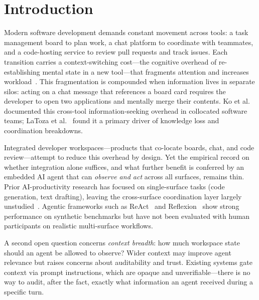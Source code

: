 \section{Introduction}
\label{sec:intro}

Modern software development demands constant movement across tools: a task
management board to plan work, a chat platform to coordinate with teammates,
and a code-hosting service to review pull requests and track issues. Each
transition carries a context-switching cost---the cognitive overhead of
re-establishing mental state in a new tool---that fragments attention and
increases workload~\cite{mark2008cost,czerwinski2004diary}. This fragmentation
is compounded when information lives in separate silos: acting on a chat
message that references a board card requires the developer to open two
applications and mentally merge their contents. Ko et
al.~\cite{ko2007information} documented this cross-tool information-seeking
overhead in collocated software teams; LaToza et al.~\cite{latoza2006maintaining}
found it a primary driver of knowledge loss and coordination breakdowns.

Integrated developer workspaces---products that co-locate boards, chat, and
code review---attempt to reduce this overhead by design. Yet the empirical record
on whether integration alone suffices, and what further benefit is conferred by
an embedded AI agent that can \emph{observe and act} across all surfaces, remains
thin. Prior AI-productivity research has focused on single-surface tasks
(code generation, text drafting), leaving the cross-surface coordination layer
largely unstudied~\cite{chen2021codex,noy2023}. Agentic frameworks such as
ReAct~\cite{yao2023react} and Reflexion~\cite{shinn2023reflexion} show strong
performance on synthetic benchmarks but have not been evaluated with human
participants on realistic multi-surface workflows.

A second open question concerns \emph{context breadth}: how much workspace state
should an agent be allowed to observe? Wider context may improve agent relevance
but raises concerns about auditability and trust. Existing systems gate context
via prompt instructions, which are opaque and unverifiable---there is no way to
audit, after the fact, exactly what information an agent received during a
specific turn.


